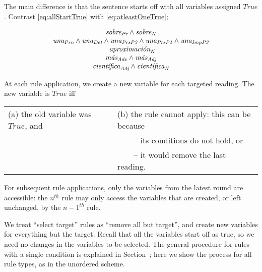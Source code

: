 The main difference is that the sentence starts off with all variables assigned $True$. Contrast \ref{eq:allStartTrue} with \ref{eq:atleastOneTrue}; 

\begin{equation}
\begin{array}{c}
\sobrePr \wedge \sobreN \\
\unaPrn \wedge \unaDet \wedge \unaPrsPThree \wedge \unaPrsPOne \wedge \unaImp \\
\aproximacionN \\
\masAdv \wedge \masAdj \\
\cientificaAdj \wedge \cientificaN \\
\end{array}
\label{eq:allStartTrue}
\end{equation}

\noindent At each rule application, we create a new variable for each targeted reading. The new variable is $True$ iff 

\begin{tabular}{l l}
(a) the old variable was $True$, and & (b) the rule cannot apply: this can be because \\
                                     & ~~~~-- its conditions do not hold, or \\
                                     & ~~~~-- it would remove the last reading.
\end{tabular}

For subsequent rule applications, only the variables from the latest round are accessible: the $n^{th}$ rule may only access the variables that are created, or left unchanged, by the $n-1^{th}$ rule. 

We treat ``{\sc select} target'' rules as ``{\sc remove} all but target'', and create new variables for everything but the target. Recall that all the variables start off as true, so we need no changes in the variables to be selected. The general procedure for rules with a single condition is explained in Section~; here we show the process for all rule types, as in the unordered scheme.

